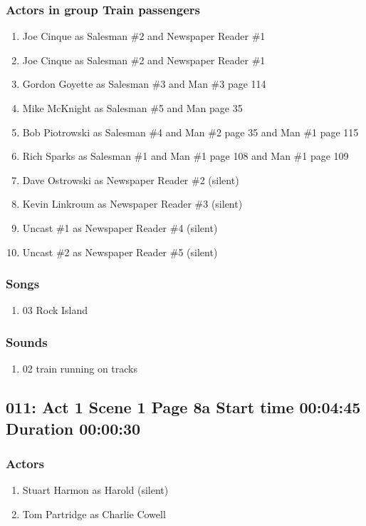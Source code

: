 \subsubsection{Actors in group Train passengers}
\begin{enumerate}
\item Joe Cinque as Salesman \#2 and Newspaper Reader \#1
\item Joe Cinque as Salesman \#2 and Newspaper Reader \#1
\item Gordon Goyette as Salesman \#3 and Man \#3 page 114
\item Mike McKnight as Salesman \#5 and Man page 35
\item Bob Piotrowski as Salesman \#4 and Man \#2 page 35 and Man \#1 page 115
\item Rich Sparks as Salesman \#1 and Man \#1 page 108 and Man \#1 page 109
\item Dave Ostrowski as Newspaper Reader \#2 (silent)
\item Kevin Linkroum as Newspaper Reader \#3 (silent)
\item Uncast \#1 as Newspaper Reader \#4 (silent)
\item Uncast \#2 as Newspaper Reader \#5 (silent)
\end{enumerate}

\subsubsection{Songs}
\begin{enumerate}
\item 03 Rock Island
\end{enumerate}\subsubsection{Sounds}
\begin{enumerate}
\item 02 train running on tracks
\end{enumerate}
\subsection{011: Act 1 Scene 1 Page 8a Start time 00:04:45 Duration 00:00:30}

\subsubsection{Actors}
\begin{enumerate}
\item Stuart Harmon as Harold (silent)
\item Tom Partridge as Charlie Cowell
\end{enumerate}
